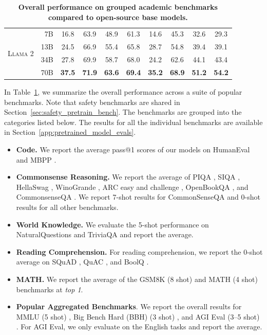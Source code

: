 \documentclass{article}
\newcommand{\cinnamon}{\textsc{Llama 2}\xspace}
\begin{document}
\begin{table}[]
{\begin{tabular}{@{}lrcccccccc@{}}
\multirow{4}{*}{\cinnamon} & 7B & 16.8 & 63.9 & 48.9 & 61.3 & 14.6 & 45.3 & 32.6 & 29.3 \\
 & 13B & 24.5 & 66.9 & 55.4 & 65.8 & 28.7 & 54.8 & 39.4 & 39.1 \\
 & 34B & 27.8 & 69.9 & 58.7 & 68.0 & 24.2 & 62.6 & 44.1 & 43.4 \\
 & 70B & \textbf{37.5} & \textbf{71.9} & \textbf{63.6} & \textbf{69.4} & \textbf{35.2} & \textbf{68.9} & \textbf{51.2} & \textbf{54.2} \\ \bottomrule
\end{tabular}}
\caption{\textbf{Overall performance on grouped academic benchmarks compared to open-source base models.}}
\label{tab:overall:opensource}
\end{table}

In Table~\ref{tab:overall:opensource}, we summarize the overall performance across a suite of popular benchmarks. Note that safety benchmarks are shared in Section~\ref{sec:safety_pretrain_bench}. The benchmarks are grouped into the categories listed below. The results for all the individual benchmarks are available in Section~\ref{app:pretrained_model_evals}.
\begin{itemize}
    \item \textbf{Code.} We report the average pass@1 scores of our models on HumanEval \citep{chen2021Evaluating} and MBPP \citep{austin2021program}. 
    \item \textbf{Commonsense Reasoning.} We report the average of PIQA \citep{bisk2020piqa}, SIQA \citep{sap2019socialiqa}, HellaSwag \citep{zellers2019hellaswag}, WinoGrande \citep{sakaguchi2021winogrande}, ARC easy and challenge \citep{clark2018think}, OpenBookQA \citep{mihaylov2018can}, and CommonsenseQA \citep{talmor2018commonsenseqa}. We report 7-shot results for CommonSenseQA and 0-shot results for all other benchmarks. 
    \item \textbf{World Knowledge.} We evaluate the 5-shot performance on NaturalQuestions \citep{kwiatkowski2019natural} and TriviaQA \citep{joshi2017triviaqa} and report the average.
    \item \textbf{Reading Comprehension.}
    For reading comprehension, we report the 0-shot average on SQuAD \citep{rajpurkar2018know}, QuAC \citep{choi2018quac}, and BoolQ \citep{clark2019boolq}.
    \item \textbf{MATH.} We report the average of the GSM8K (8 shot) \citep{cobbe2021training} and MATH (4 shot) \citep{hendrycks2021measuring} benchmarks at \textit{top 1}.
    \item \textbf{Popular Aggregated Benchmarks}. We report the overall results for MMLU (5 shot) \citep{Hendrycks2020MeasuringMM}, Big Bench Hard (BBH) (3 shot) \citep{suzgun2022challenging}, and AGI Eval (3--5 shot) \citep{zhong2023agieval}. 
    For AGI Eval, we only evaluate on the English tasks and report the average. 
\end{itemize}
\end{document}
